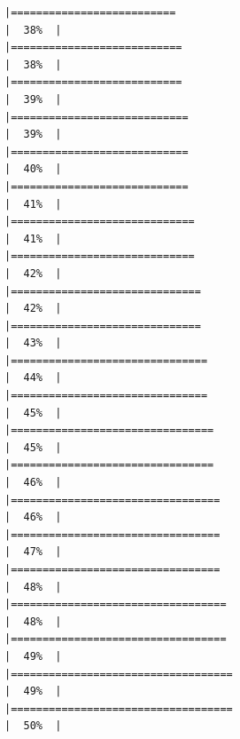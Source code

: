 \documentclass[
]{article}
\begin{document}
\begin{verbatim}
|==========================                                            |  38%  |                                                                              |===========================                                           |  38%  |                                                                              |===========================                                           |  39%  |                                                                              |============================                                          |  39%  |                                                                              |============================                                          |  40%  |                                                                              |============================                                          |  41%  |                                                                              |=============================                                         |  41%  |                                                                              |=============================                                         |  42%  |                                                                              |==============================                                        |  42%  |                                                                              |==============================                                        |  43%  |                                                                              |===============================                                       |  44%  |                                                                              |===============================                                       |  45%  |                                                                              |================================                                      |  45%  |                                                                              |================================                                      |  46%  |                                                                              |=================================                                     |  46%  |                                                                              |=================================                                     |  47%  |                                                                              |=================================                                     |  48%  |                                                                              |==================================                                    |  48%  |                                                                              |==================================                                    |  49%  |                                                                              |===================================                                   |  49%  |                                                                              |===================================                                   |  50%  |                                                                              
\end{verbatim}
\end{document}

